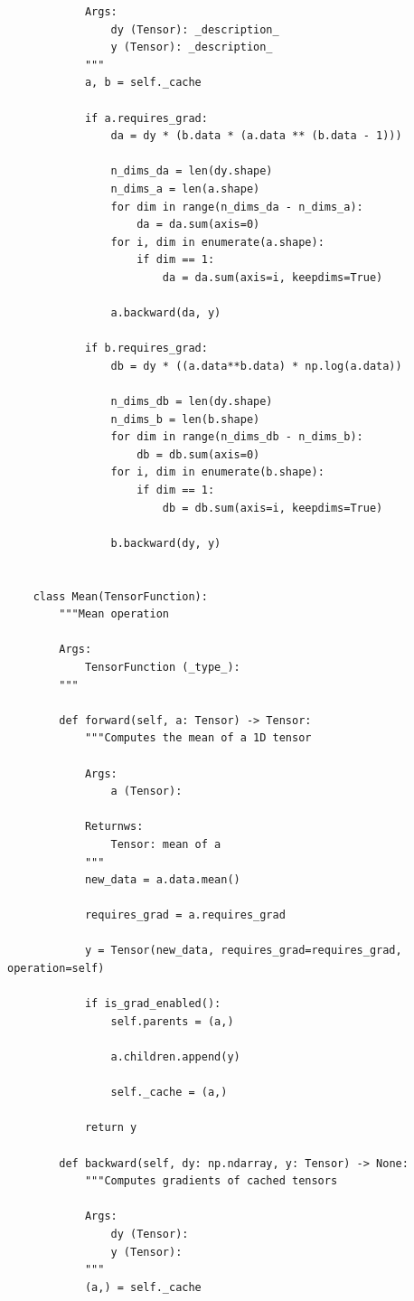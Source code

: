 \documentclass{article}
\begin{document}
\begin{verbatim}
            Args:
                dy (Tensor): _description_
                y (Tensor): _description_
            """
            a, b = self._cache

            if a.requires_grad:
                da = dy * (b.data * (a.data ** (b.data - 1)))

                n_dims_da = len(dy.shape)
                n_dims_a = len(a.shape)
                for dim in range(n_dims_da - n_dims_a):
                    da = da.sum(axis=0)
                for i, dim in enumerate(a.shape):
                    if dim == 1:
                        da = da.sum(axis=i, keepdims=True)

                a.backward(da, y)

            if b.requires_grad:
                db = dy * ((a.data**b.data) * np.log(a.data))

                n_dims_db = len(dy.shape)
                n_dims_b = len(b.shape)
                for dim in range(n_dims_db - n_dims_b):
                    db = db.sum(axis=0)
                for i, dim in enumerate(b.shape):
                    if dim == 1:
                        db = db.sum(axis=i, keepdims=True)

                b.backward(dy, y)


    class Mean(TensorFunction):
        """Mean operation

        Args:
            TensorFunction (_type_):
        """

        def forward(self, a: Tensor) -> Tensor:
            """Computes the mean of a 1D tensor

            Args:
                a (Tensor):

            Returnws:
                Tensor: mean of a
            """
            new_data = a.data.mean()

            requires_grad = a.requires_grad

            y = Tensor(new_data, requires_grad=requires_grad, operation=self)

            if is_grad_enabled():
                self.parents = (a,)

                a.children.append(y)

                self._cache = (a,)

            return y

        def backward(self, dy: np.ndarray, y: Tensor) -> None:
            """Computes gradients of cached tensors

            Args:
                dy (Tensor):
                y (Tensor):
            """
            (a,) = self._cache


\end{verbatim}
\end{document}
